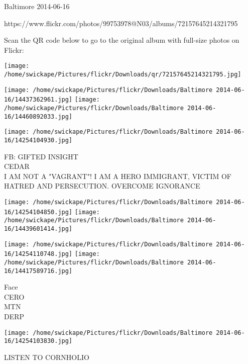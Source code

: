 \documentclass[10pt,letterpaper]{article}
\begin{document}
Baltimore 2014-06-16

https://www.flickr.com/photos/99753978@N03/albums/72157645214321795

Scan the QR code below to go to the original album with full-size photos on Flickr:

\texttt{[image: /home/swickape/Pictures/flickr/Downloads/qr/72157645214321795.jpg]}
\pagebreak

\texttt{[image: /home/swickape/Pictures/flickr/Downloads/Baltimore 2014-06-16/14437362961.jpg]}
\texttt{[image: /home/swickape/Pictures/flickr/Downloads/Baltimore 2014-06-16/14460892033.jpg]}

\vspace{0.25in}
\texttt{[image: /home/swickape/Pictures/flickr/Downloads/Baltimore 2014-06-16/14254104930.jpg]}

FB: GIFTED INSIGHT\\
CEDAR\\
I AM NOT A "VAGRANT"!  I AM A HERO IMMIGRANT, VICTIM OF HATRED AND PERSECUTION.  OVERCOME IGNORANCE
\pagebreak

\texttt{[image: /home/swickape/Pictures/flickr/Downloads/Baltimore 2014-06-16/14254104850.jpg]}
\texttt{[image: /home/swickape/Pictures/flickr/Downloads/Baltimore 2014-06-16/14439601414.jpg]}

\texttt{[image: /home/swickape/Pictures/flickr/Downloads/Baltimore 2014-06-16/14254110748.jpg]}
\texttt{[image: /home/swickape/Pictures/flickr/Downloads/Baltimore 2014-06-16/14417589716.jpg]}

Face\\
CERO\\
MTN\\
DERP
\pagebreak

\texttt{[image: /home/swickape/Pictures/flickr/Downloads/Baltimore 2014-06-16/14254103830.jpg]}

LISTEN TO CORNHOLIO
\pagebreak
\end{document}
